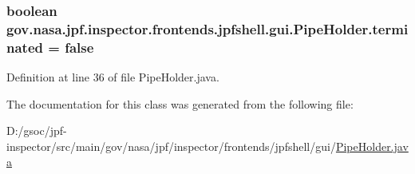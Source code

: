 \subsubsection[{\texorpdfstring{terminated}{terminated}}]{\setlength{\rightskip}{0pt plus 5cm}boolean gov.\+nasa.\+jpf.\+inspector.\+frontends.\+jpfshell.\+gui.\+Pipe\+Holder.\+terminated = false\hspace{0.3cm}{\ttfamily [private]}}\hypertarget{classgov_1_1nasa_1_1jpf_1_1inspector_1_1frontends_1_1jpfshell_1_1gui_1_1_pipe_holder_ad79f1e1825f9b81ca68005ff84b1ce7f}{}\label{classgov_1_1nasa_1_1jpf_1_1inspector_1_1frontends_1_1jpfshell_1_1gui_1_1_pipe_holder_ad79f1e1825f9b81ca68005ff84b1ce7f}


Definition at line 36 of file Pipe\+Holder.\+java.



The documentation for this class was generated from the following file\+:\begin{DoxyCompactItemize}
\item 
D\+:/gsoc/jpf-\/inspector/src/main/gov/nasa/jpf/inspector/frontends/jpfshell/gui/\hyperlink{_pipe_holder_8java}{Pipe\+Holder.\+java}\end{DoxyCompactItemize}
